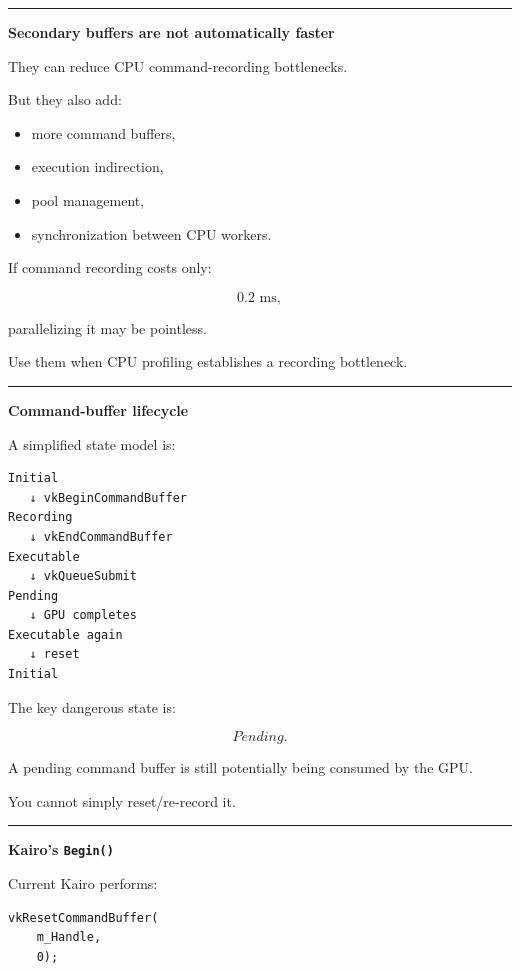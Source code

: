 \begin{center}\rule{0.5\linewidth}{0.5pt}\end{center}

\textbf{Secondary buffers are not automatically faster}

They can reduce CPU command-recording bottlenecks.

But they also add:

\begin{itemize}
\tightlist
\item
  more command buffers,
\item
  execution indirection,
\item
  pool management,
\item
  synchronization between CPU workers.
\end{itemize}

If command recording costs only:

\[
0.2\text{ ms},
\]

parallelizing it may be pointless.

Use them when CPU profiling establishes a recording bottleneck.

\begin{center}\rule{0.5\linewidth}{0.5pt}\end{center}

\textbf{Command-buffer lifecycle}

A simplified state model is:

\begin{verbatim}
Initial
   ↓ vkBeginCommandBuffer
Recording
   ↓ vkEndCommandBuffer
Executable
   ↓ vkQueueSubmit
Pending
   ↓ GPU completes
Executable again
   ↓ reset
Initial
\end{verbatim}

The key dangerous state is:

\[
\boxed{Pending}.
\]

A pending command buffer is still potentially being consumed by the GPU.

You cannot simply reset/re-record it.

\begin{center}\rule{0.5\linewidth}{0.5pt}\end{center}

\textbf{Kairo's \texttt{Begin()}}

Current Kairo performs:

\begin{verbatim}
vkResetCommandBuffer(
    m_Handle,
    0);
\end{verbatim}


